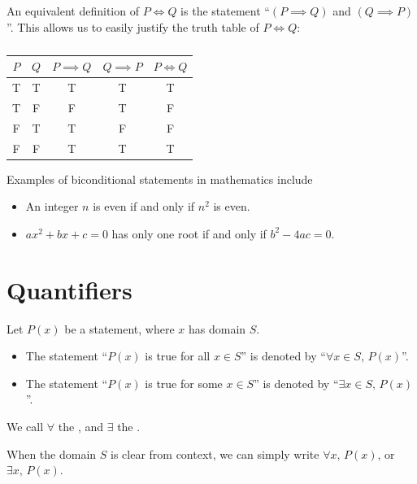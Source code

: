 An equivalent definition of $P \iff Q$ is the statement ``$(P \implies Q)$ and $(Q \implies P)$''. This allows us to easily justify the truth table of $P \iff Q$:
\begin{table}[H]
    \centering
    \begin{tabular}{|c|c|c|c|c|}
    \hline
    $P$ & $Q$ & $P \implies Q$ & $Q \implies P$ & $P \iff Q$ \\ \hline\hline
    T & T & T & T & T \\ \hline
    T & F & F & T & F \\ \hline
    F & T & T & F & F \\ \hline
    F & F & T & T & T \\ \hline
    \end{tabular}
    \caption{}
\end{table}

\begin{example}
    Examples of biconditional statements in mathematics include
    \begin{itemize}
        \item An integer $n$ is even if and only if $n^2$ is even.
        \item $ax^2 + bx + c = 0$ has only one root if and only if $b^2 - 4ac = 0$.
    \end{itemize}
\end{example}

\section{Quantifiers}

\begin{definition}
    Let $P(x)$ be a statement, where $x$ has domain $S$.
    \begin{itemize}
        \item The statement ``$P(x)$ is true for all $x \in S$'' is denoted by ``$\forall x \in S, \, P(x)$''.
        \item The statement ``$P(x)$ is true for some $x \in S$'' is denoted by ``$\exists x \in S, \, P(x)$''.
    \end{itemize}
\end{definition}

We call $\forall$ the , and $\exists$ the .

When the domain $S$ is clear from context, we can simply write $\forall x, \, P(x)$, or $\exists x, \, P(x)$.


